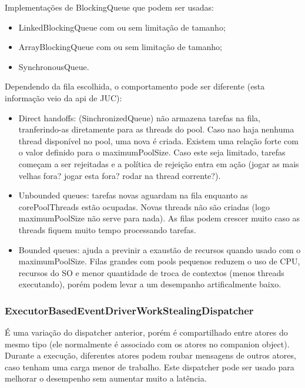 \documentclass[]{article}
\begin{document}
			Implementações de BlockingQueue que podem ser usadas:
			\begin{itemize}
				\item LinkedBlockingQueue com ou sem limitação de tamanho;
				\item ArrayBlockingQueue com ou sem limitação de tamanho;
				\item SynchronousQueue.
			\end{itemize}
			Dependendo da fila escolhida, o comportamento pode ser diferente (esta informação veio da api de JUC):
			\begin{itemize}
				\item Direct handoffs: (SinchronizedQueue) não armazena tarefas na fila, tranferindo-as diretamente para
				as threads do pool.
				Caso nao haja nenhuma thread disponível no pool, uma nova é criada. Existem uma relação forte com o valor
				definido para o maximumPoolSize. Caso este seja limitado, tarefas começam a ser rejeitadas e a política
				de rejeição entra em ação (jogar as mais velhas fora? jogar esta fora? rodar na thread corrente?).

				\item Unbounded queues: tarefas novas aguardam na fila enquanto as corePoolThreads estão ocupadas. Novas
				threads não são criadas (logo maximumPoolSize não serve para nada). As filas podem crescer muito caso
				as threads fiquem muito tempo processando tarefas.
				
				\item Bounded queues: ajuda a previnir a exaustão de recursos quando usado com o maximumPoolSize. Filas
				grandes com pools pequenos reduzem o uso de CPU, recursos do SO e menor quantidade de troca de 
				contextos (menos threads executando), porém podem levar a um desempanho artificalmente baixo.				
			\end{itemize}
						
			\subsubsection{ExecutorBasedEventDriverWorkStealingDispatcher}
			É uma variação do dispatcher anterior, porém é compartilhado entre atores do mesmo tipo 
			(ele normalmente é associado com os atores no companion object). Durante a execução, diferentes atores
			podem roubar mensagens de outros atores, caso tenham uma carga menor de trabalho. Este dispatcher pode
			ser usado para melhorar o desempenho sem aumentar muito a latência.\\
\end{document}
